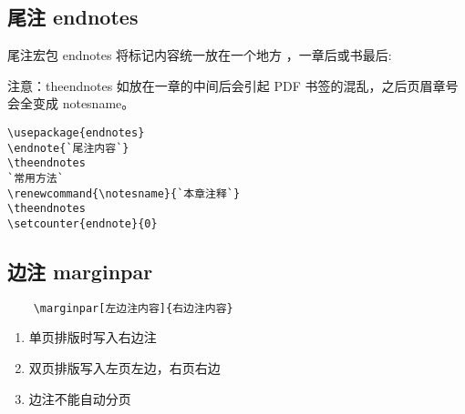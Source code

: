 \subsection{尾注 endnotes}

尾注宏包 endnotes 将标记内容统一放在一个地方 ，一章后或书最后:

注意：theendnotes 如放在一章的中间后会引起 PDF 书签的混乱，之后页眉章号会全变成 notesname。
\begin{lstlisting}[language={[LaTeX]TeX}]
\usepackage{endnotes}
\endnote{`尾注内容`}
\theendnotes
`常用方法`
\renewcommand{\notesname}{`本章注释`}
\theendnotes
\setcounter{endnote}{0}
\end{lstlisting}



\subsection{边注 marginpar}

\begin{shaded}
  \begin{Verbatim}
    \marginpar[左边注内容]{右边注内容}
  \end{Verbatim}
\end{shaded}
\begin{enumerate}
  \item 单页排版时写入右边注
  \item 双页排版写入左页左边，右页右边
  \item 边注不能自动分页
\end{enumerate}
